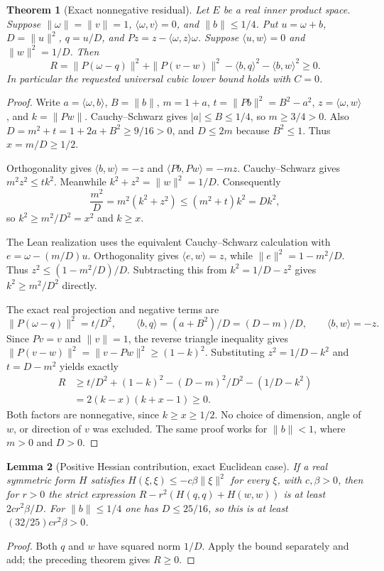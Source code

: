 \documentclass[11pt]{article}
\newtheorem{theorem}{Theorem}[section]
\newtheorem{lemma}[theorem]{Lemma}
\theoremstyle{definition}
\theoremstyle{remark}
\numberwithin{equation}{section}
\begin{document}
\begin{theorem}[Exact nonnegative residual]
Let $E$ be a real inner product space. Suppose $\|\omega\|=\|v\|=1$,
$\langle\omega,v\rangle=0$, and $\|b\|\le1/4$. Put
$u=\omega+b$, $D=\|u\|^2$, $q=u/D$, and
$Pz=z-\langle\omega,z\rangle\omega$. Suppose
$\langle u,w\rangle=0$ and $\|w\|^2=1/D$. Then
\[
 R=\|P(\omega-q)\|^2+\|P(v-w)\|^2
       -\langle b,q\rangle^2-\langle b,w\rangle^2\ge0.
\]
In particular the requested universal cubic lower bound holds with $C=0$.
\end{theorem}
\begin{proof}
Write $a=\langle\omega,b\rangle$, $B=\|b\|$, $m=1+a$,
$t=\|Pb\|^2=B^2-a^2$, $z=\langle\omega,w\rangle$,
and $k=\|Pw\|$. Cauchy--Schwarz gives $|a|\le B\le1/4$,
so $m\ge3/4>0$. Also $D=m^2+t=1+2a+B^2\ge9/16>0$,
and $D\le2m$ because $B^2\le1$. Thus $x=m/D\ge1/2$.

Orthogonality gives $\langle b,w\rangle=-z$ and
$\langle Pb,Pw\rangle=-mz$. Cauchy--Schwarz gives
$m^2z^2\le t k^2$. Meanwhile
$k^2+z^2=\|w\|^2=1/D$. Consequently
\[
 \frac{m^2}{D}=m^2(k^2+z^2)
 \le(m^2+t)k^2=Dk^2,
\]
so $k^2\ge m^2/D^2=x^2$ and $k\ge x$.

The Lean realization uses the equivalent Cauchy--Schwarz calculation
with $e=\omega-(m/D)u$. Orthogonality gives $\langle e,w\rangle=z$,
while $\|e\|^2=1-m^2/D$. Thus
$z^2\le(1-m^2/D)/D$. Subtracting this from
$k^2=1/D-z^2$ gives $k^2\ge m^2/D^2$ directly.

The exact real projection and negative terms are
\[
 \|P(\omega-q)\|^2=t/D^2,\qquad
 \langle b,q\rangle=(a+B^2)/D=(D-m)/D,\qquad
 \langle b,w\rangle=-z.
\]
Since $Pv=v$ and $\|v\|=1$, the reverse triangle inequality gives
$\|P(v-w)\|^2=\|v-Pw\|^2\ge(1-k)^2$.
Substituting $z^2=1/D-k^2$ and $t=D-m^2$ yields exactly
\begin{align*}
 R&\ge t/D^2+(1-k)^2-(D-m)^2/D^2-(1/D-k^2)\\
 &=2(k-x)(k+x-1)\ge0.
\end{align*}
Both factors are nonnegative, since $k\ge x\ge1/2$.
No choice of dimension, angle of $w$, or direction of $v$ was excluded.
The same proof works for $\|b\|<1$, where $m>0$ and $D>0$.
\end{proof}

\begin{lemma}[Positive Hessian contribution, exact Euclidean case]\label{geometry:hessian}
If a real symmetric form $H$ satisfies $H(\xi,\xi)\le-c\beta\|\xi\|^2$
for every $\xi$, with $c,\beta>0$, then for $r>0$ the strict expression
$R-r^2(H(q,q)+H(w,w))$ is at least
$2c r^2\beta/D$. For $\|b\|\le1/4$ one has $D\le25/16$,
so this is at least $(32/25)c r^2\beta>0$.
\end{lemma}
\begin{proof}
Both $q$ and $w$ have squared norm $1/D$. Apply the bound separately
and add; the preceding theorem gives $R\ge0$.
\end{proof}
\end{document}
